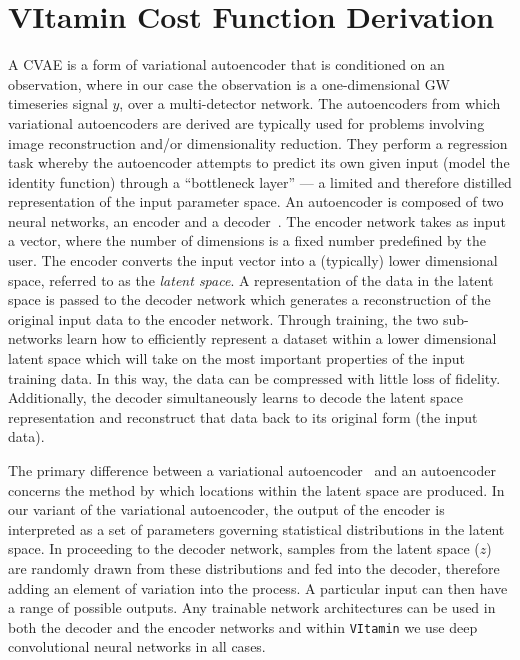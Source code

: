 %
%
\section{VItamin Cost Function Derivation}\label{sec:vit_cost_derivation}
%
A \ac{CVAE} is a form of variational autoencoder that is conditioned on an observation, 
where in our case the observation is a one-dimensional \ac{GW} timeseries 
signal $y$, over a multi-detector network. The autoencoders from which variational 
autoencoders are derived are typically used for problems involving image reconstruction 
and/or dimensionality reduction. They perform a regression task whereby the 
autoencoder attempts to predict its own given input (model the identity function) through a 
``bottleneck layer'' --- a limited and therefore distilled representation of the input 
parameter space. An autoencoder is composed of two neural networks, an encoder and 
a decoder~\cite{gallinari1987memoires}. The encoder network takes as input a vector, where the 
number of dimensions is a fixed number predefined by the user. The encoder converts the 
input vector into a (typically) lower dimensional space, referred to as the 
{\it{latent space}}. A representation of the data in the latent space is passed to 
the decoder network which generates a reconstruction of the original input data to 
the encoder network. Through training, the two sub-networks learn how to efficiently 
represent a dataset within a lower dimensional latent space which will take on the most 
important properties of the input training data. In this way, the data can be compressed with 
little loss of fidelity. Additionally, the decoder simultaneously learns to decode the 
latent space representation and reconstruct that data back to its original form (the input data).

%
%
The primary difference between a variational autoencoder~\cite{1812.04405} and an 
autoencoder concerns the method by which locations within the latent space are produced. 
In our variant of the variational autoencoder, the output of the encoder is interpreted 
as a set of parameters governing statistical
distributions in the latent space. In proceeding to the decoder network, samples 
from the latent space ($z$) are randomly drawn from these distributions and fed 
into the decoder, therefore adding an element of variation into the process. A particular 
input can then have a range of possible outputs. Any trainable network architectures 
can be used in both the decoder and the encoder networks and within 
\texttt{VItamin} we use deep convolutional neural networks in all cases.


